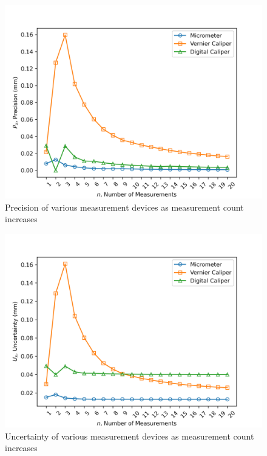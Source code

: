 \section{}
\subsection{}

\begin{figure}[h]
    \centering
    \includegraphics[width=0.8\linewidth]{Questions/Plots/Q3_Precision.png}
    \caption{Precision of various  measurement devices as measurement count increases} 
    \label{fig:precision-of-measurement-devices}
\end{figure}

\begin{figure}[h]
    \centering
    \includegraphics[width=0.8\linewidth]{Questions/Plots/Q3_Uncertainty.png}
    \caption{Uncertainty of various measurement devices as measurement count increases}
    \label{fig:uncertainty-of-measurement-devices}
\end{figure}

